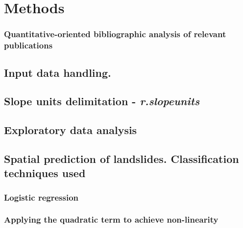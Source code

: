 \chapter{Methods} \label{methods}
{\textcolor{red}{ \lipsum[1]}}

\subsection{Quantitative-oriented bibliographic analysis of relevant publications}\label{Methods_quant_rev}

{\textcolor{red}{ \lipsum[1]}} 


\section{Input data handling.}\label{Methods-Input data}

{\textcolor{red}{ \lipsum[1]}}


\section{Slope units delimitation - \textit{r.slopeunits}}\label{SU}

{\textcolor{red}{ \lipsum[1]}}


    
    
    
    
         
\section{Exploratory data analysis}\label{Methods-Exploratory}

    {\textcolor{red}{ \lipsum[1]}}

    
\section{Spatial prediction of landslides. Classification techniques used}
    
{\textcolor{red}{ \lipsum[1]}}


\subsection{Logistic regression}\label{LR}

{\textcolor{red}{ \lipsum[1]}}
        
        
\subsection{Applying the quadratic term to achieve non-linearity} \label{quadratic term}
{\textcolor{red}{ \lipsum[1]}}


